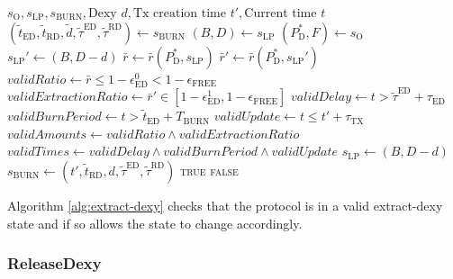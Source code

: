 \documentclass{ifcolog}
\newcommand{\Pdt}{P_{\mathrm{D}}^{*}}
\newcommand{\rr}{\bar{r}}
\newcommand{\slp}{s_{\mathrm{LP}}}
\newcommand{\soracle}{s_{\textrm{O}}}
\newcommand{\sburn}{s_{\textrm{BURN}}}
\newcommand{\tautx}{\tau_{\textrm{TX}}}
\newcommand{\epsilonfree}{\epsilon_{\textrm{FREE}}}
\newcommand{\epsilondexyzero}{\epsilon_{\textrm{ED}}^{0}}
\newcommand{\epsilondexyone}{\epsilon_{\textrm{ED}}^{1}}
\begin{document}
\begin{algorithm}[H]
\caption{ExtractDexy}\label{alg:extract-dexy}
\begin{algorithmic}[1]
  \Require $\soracle, \slp, \sburn, \textrm{Dexy } d, \textrm{Tx creation time } t', \textrm{Current time } t$
  \State $(\tilde{t}_{\textrm{ED}}, \tilde{t}_{\textrm{RD}}, \tilde{d}, \tilde{\tau}^{\textrm{ED}}, \tilde{\tau}^{\textrm{RD}}) \gets \sburn$
  \State $(B, D) \gets \slp$
  \State $(\Pdt, F) \gets \soracle$
  \State $\slp' \gets (B, D - d)$ 
  \State $\rr \gets \rr(\Pdt, \slp) $
  \State $\rr' \gets \rr(\Pdt, \slp')$
  \State $validRatio \gets \rr \le 1 - \epsilondexyzero < 1 - \epsilonfree$
  \State $validExtractionRatio \gets \rr' \in \left[ 1-\epsilondexyone, 1 - \epsilonfree \right]$
  \State $validDelay \gets t > \tilde{\tau}^{\textrm{ED}} + \tau_{\textrm{ED}}$
  \State $validBurnPeriod \gets t > \tilde{t}_{\textrm{ED}} + T_{\textrm{BURN}}$
  \State $validUpdate \gets t \le t' + \tautx$
  \State $validAmounts \gets validRatio \land validExtractionRatio$
  \State $validTimes \gets validDelay \land validBurnPeriod \land validUpdate$
    \State $\slp \gets (B, D-d)$
    \State $\sburn \gets (t', \tilde{t}_{\textrm{RD}}, d, \tilde{\tau}^{\textrm{ED}}, \tilde{\tau}^{\textrm{RD}})$
    \State \Return \textsc{true}
  \Else
    \State \Return \textsc{false}
  \EndIf
\end{algorithmic}
\end{algorithm}

Algorithm \ref{alg:extract-dexy} checks that the protocol is in a valid extract-dexy state and if so allows the state to change accordingly.

\newpage

\subsubsection{ReleaseDexy}
\end{document}

